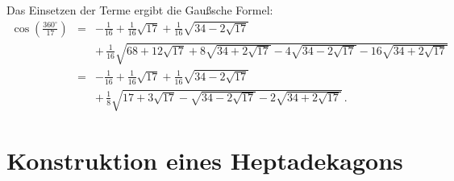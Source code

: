 Das Einsetzen der Terme ergibt die Gaußsche Formel:
\begin{eqnarray*}
\cos\left(\frac{360^\circ}{17}\right) &=&
-\frac{1}{16}+\frac{1}{16}\sqrt{17} + 
     \frac{1}{16}\sqrt{34-2\sqrt{17}} \\
    &&
     +\,\frac{1}{16}\sqrt{
     68+12\sqrt{17} + 
     8\sqrt{34+2\sqrt{17}}-4\sqrt{34-2\sqrt{17}}
   -16
     \sqrt{34+2\sqrt{17}}
   }\\
&=&-\frac{1}{16}+\frac{1}{16}\sqrt{17} + 
     \frac{1}{16}\sqrt{34-2\sqrt{17}}\\
&&+\,\frac{1}{8}\sqrt{
     17+3\sqrt{17} - 
     \sqrt{34-2\sqrt{17}}
   -2
     \sqrt{34+2\sqrt{17}}
   }\,.
\end{eqnarray*}

\section{Konstruktion eines Heptadekagons}\label{s.construction}

